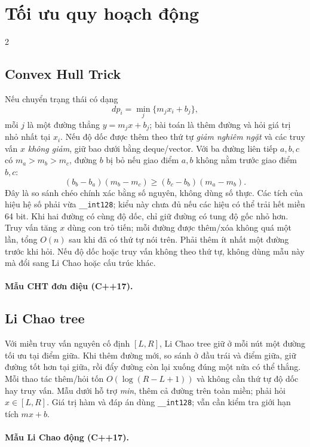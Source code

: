 \section{Tối ưu quy hoạch động}
\begingroup\small
\begin{multicols}{2}
\subsection{Convex Hull Trick}
Nếu chuyển trạng thái có dạng
\[
dp_i=\min_j\{m_jx_i+b_j\},
\]
mỗi $j$ là một đường thẳng $y=m_jx+b_j$; bài toán là
thêm đường và hỏi giá trị nhỏ nhất tại $x_i$.
Nếu độ dốc được thêm theo thứ tự \emph{giảm nghiêm ngặt}
và các truy vấn $x$ \emph{không giảm}, giữ bao dưới bằng deque/vector.
Với ba đường liên tiếp $a,b,c$ có $m_a>m_b>m_c$, đường $b$
bị bỏ nếu giao điểm $a,b$ không nằm trước giao điểm $b,c$:
\[
(b_b-b_a)(m_b-m_c)\ge
(b_c-b_b)(m_a-m_b).
\]
Đây là so sánh chéo chính xác bằng số nguyên, không dùng số thực.
Các tích của hiệu hệ số phải vừa \texttt{\_\_int128};
kiểu này chưa đủ nếu các hiệu có thể trải hết miền 64 bit.
Khi hai đường có cùng độ dốc, chỉ giữ đường có tung độ gốc nhỏ hơn.
Truy vấn tăng $x$ dùng con trỏ tiến; mỗi đường được thêm/xóa
không quá một lần, tổng $O(n)$ sau khi đã có thứ tự nói trên.
Phải thêm ít nhất một đường trước khi hỏi.
Nếu độ dốc hoặc truy vấn không theo thứ tự, không dùng mẫu này
mà đổi sang Li Chao hoặc cấu trúc khác.

\paragraph{Mẫu CHT đơn điệu (C++17).}

\subsection{Li Chao tree}
Với miền truy vấn nguyên cố định $[L,R]$, Li Chao tree giữ ở
mỗi nút một đường tối ưu tại điểm giữa. Khi thêm đường mới,
so sánh ở đầu trái và điểm giữa, giữ đường tốt hơn tại giữa,
rồi đẩy đường còn lại xuống đúng một nửa có thể thắng.
Mỗi thao tác thêm/hỏi tốn $O(\log(R-L+1))$ và không cần
thứ tự độ dốc hay truy vấn. Mẫu dưới hỗ trợ \emph{min}, thêm
cả đường trên toàn miền; phải hỏi $x\in[L,R]$.
Giá trị hàm và đáp án dùng \texttt{\_\_int128}; vẫn cần kiểm
tra giới hạn tích $mx+b$.

\paragraph{Mẫu Li Chao động (C++17).}


\end{multicols}
